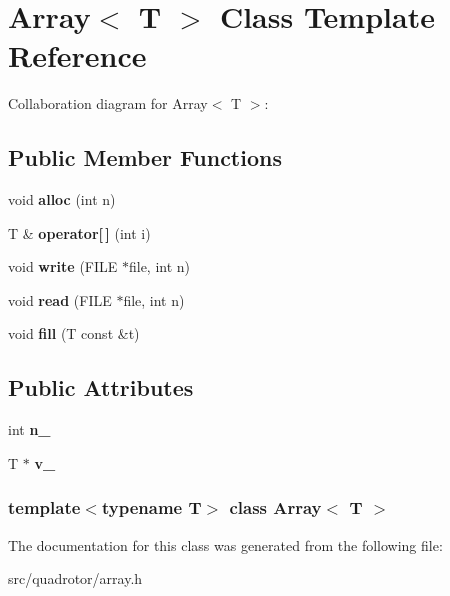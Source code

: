 \hypertarget{classArray}{
\section{Array$<$ T $>$ Class Template Reference}
\label{classArray}
}
Collaboration diagram for Array$<$ T $>$:\subsection*{Public Member Functions}
\begin{DoxyCompactItemize}
\item 
\hypertarget{classArray_a590e6a7f6a10122acf677b5f7191e9ec}{
void {\bfseries alloc} (int n)}
\label{classArray_a590e6a7f6a10122acf677b5f7191e9ec}

\item 
\hypertarget{classArray_ae911195ae0ab8040c8780c6fc0a11b1b}{
T \& {\bfseries operator\mbox{[}$\,$\mbox{]}} (int i)}
\label{classArray_ae911195ae0ab8040c8780c6fc0a11b1b}

\item 
\hypertarget{classArray_a1980151be6d25c4d8acaaee358881a0d}{
void {\bfseries write} (FILE $\ast$file, int n)}
\label{classArray_a1980151be6d25c4d8acaaee358881a0d}

\item 
\hypertarget{classArray_a728430d7e0933b1ab4607ba98255c2ef}{
void {\bfseries read} (FILE $\ast$file, int n)}
\label{classArray_a728430d7e0933b1ab4607ba98255c2ef}

\item 
\hypertarget{classArray_a3e395a7a0ba33776744d7af2c387ebd8}{
void {\bfseries fill} (T const \&t)}
\label{classArray_a3e395a7a0ba33776744d7af2c387ebd8}

\end{DoxyCompactItemize}
\subsection*{Public Attributes}
\begin{DoxyCompactItemize}
\item 
\hypertarget{classArray_ac6494b108f60fb2d80ab65d7bb75390a}{
int {\bfseries n\_\-}}
\label{classArray_ac6494b108f60fb2d80ab65d7bb75390a}

\item 
\hypertarget{classArray_af7695e08563d3f4454f1213ca0d7b88a}{
T $\ast$ {\bfseries v\_\-}}
\label{classArray_af7695e08563d3f4454f1213ca0d7b88a}

\end{DoxyCompactItemize}
\subsubsection*{template$<$typename T$>$ class Array$<$ T $>$}



The documentation for this class was generated from the following file:\begin{DoxyCompactItemize}
\item 
src/quadrotor/array.h\end{DoxyCompactItemize}
